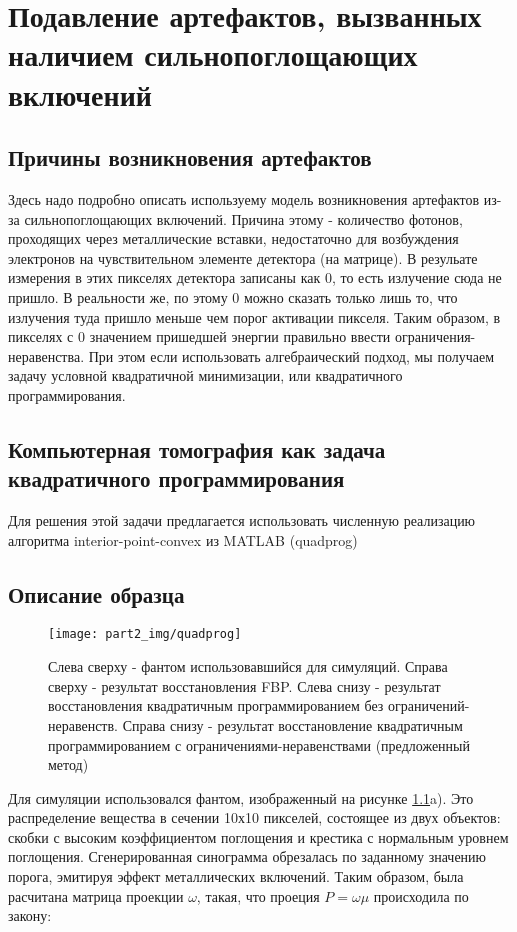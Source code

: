 \chapter{Подавление артефактов, вызванных наличием сильнопоглощающих включений} \label{chapt2}
\section{Причины возникновения артефактов}
\label{sect_2_0}
Здесь надо подробно описать используему модель возникновения артефактов из-за сильнопоглощающих включений.
Причина этому - количество фотонов, проходящих через металлические вставки, недостаточно для возбуждения электронов на чувствительном элементе детектора (на матрице).
В резульате измерения в этих пикселях детектора записаны как 0, то есть излучение сюда не пришло.
В реальности же, по этому 0 можно сказать только лишь то, что излучения туда пришло меньше чем порог активации пикселя.
Таким образом, в пикселях с 0 значением пришедшей энергии правильно ввести ограничения-неравенства.
При этом если использовать алгебраический подход, мы получаем задачу условной квадратичной минимизации, или квадратичного программирования.

\section{Компьютерная томография как задача квадратичного программирования} \label{sect_2_1}

Для решения этой задачи предлагается использовать численную реализацию алгоритма interior-point-convex из MATLAB (quadprog) 

\section{Описание образца} \label{sect_2_1_1}
\begin{figure}
  \centering
  \texttt{[image: part2\_img/quadprog]}
  \caption{Слева сверху - фантом использовавшийся для симуляций. Справа сверху - результат восстановления FBP. Слева снизу - результат восстановления квадратичным программированием без ограничений-неравенств. Справа снизу - результат восстановление квадратичным программированием с ограничениями-неравенствами (предложенный метод)}
  \label{im:quadprog}
\end{figure}

Для симуляции использовался фантом, изображенный на рисунке \ref{im:quadprog}a).
Это распределение вещества в сечении 10х10 пикселей, состоящее из двух объектов: скобки с высоким коэффициентом поглощения и крестика с нормальным уровнем поглощения.
Сгенерированная синограмма обрезалась по заданному значению порога, эмитируя эффект металлических включений.
Таким образом, была расчитана матрица проекции $\omega$, такая, что проеция $P = \omega \mu$ происходила по закону:

